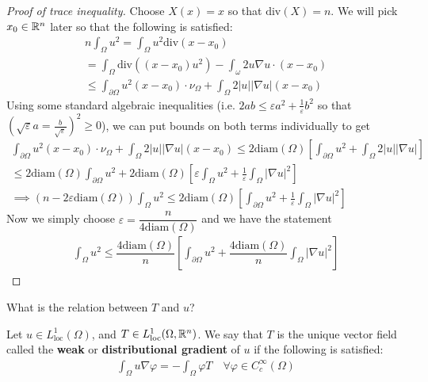 \documentclass{memoir}
\begin{document}
\begin{proof}[Proof of trace inequality]
	Choose \(X(x) = x\) so that \(\textrm{div}(X) = n\). We will pick \(x_0 \in \mathbb{R}^{n}\) later so that the following is satisfied:
	\begin{align*}
		n \int_\Omega u^2 = \int_\Omega u^2 \textrm{div}(x-x_0)\\
		= \int_\Omega \textrm{div}\left( (x-x_0)u^2 \right) - \int_\omega 2u \nabla u \cdot (x-x_0)\\
		\leq  \int_{\partial \Omega }u^2(x-x_0)\cdot \nu_\Omega + \int_\Omega 2 \left| u \right| \left| \nabla u \right| (x-x_0)
	\end{align*}
	Using some standard algebraic inequalities (i.e. \(2ab \leq \varepsilon a^2 + \frac{1}{\varepsilon}b^2\) so that \((\sqrt{\varepsilon} a = \frac{b}{\sqrt{\varepsilon} })^2\geq 0\)), we can put bounds on both terms individually to get
	\begin{align*}
		\int_{\partial \Omega } u^2(x-x_0) \cdot \nu_\Omega + \int_\Omega 2 \left| u \right| \left| \nabla u \right| (x-x_0)\leq 2 \textrm{diam} (\Omega ) \left[ \int_{\partial \Omega }u^2 + \int_\Omega 2\left| u \right| \left| \nabla u \right|  \right]\\
		\leq 2 \textrm{diam}(\Omega ) \int_{\partial \Omega } u^2+ 2 \textrm{diam}(\Omega ) \left[ \varepsilon \int_{\Omega }u^2 + \frac{1}{\varepsilon} \int_{\Omega } \left| \nabla u \right|^2 \right]\\
		\implies \left( n-2\varepsilon\textrm{diam}(\Omega ) \right) \int_{\Omega } u^2 \leq 2 \textrm{diam}(\Omega )\left[ \int_{\partial \Omega }u^2 + \frac{1}{\varepsilon} \int_\Omega  \left| \nabla u \right|^2 \right] 
	\end{align*}
	Now we simply choose \(\varepsilon = \dfrac{n}{4 \textrm{diam}(\Omega )}\) and we have the statement
	\begin{align*}
		\int_\Omega u^2 \leq \dfrac{4 \textrm{diam}(\Omega)}{n} \left[ \int_{\partial \Omega }u^2 + \dfrac{4 \textrm{diam}(\Omega )}{n} \int_\Omega  \left| \nabla u \right|^2 \right] 
	\end{align*}
\end{proof}

What is the relation between \(T\) and \(u\)?

\begin{defn}
	Let \(u \in L^{1}_{\textrm{loc}}(\Omega )\), and \(T \in L^{1}_{\textrm{loc}}(\Omega , \mathbb{R}^{n})\). We say that \(T\) is the unique vector field called the \textbf{weak} or \textbf{distributional gradient} of \(u\) if the following is satisfied:
	\begin{align*}
		\int_\Omega u \nabla \varphi = - \int_\Omega \varphi T \quad \forall \varphi  \in C^{\infty}_c (\Omega )
	\end{align*}
\end{defn}
\end{document}
